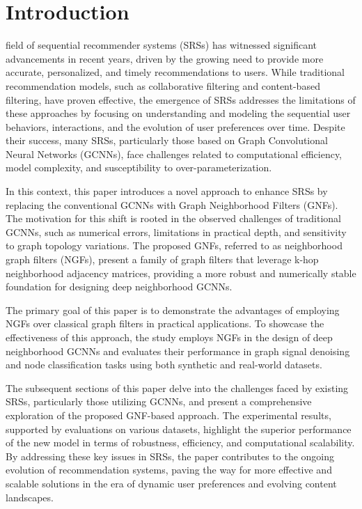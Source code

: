 \documentclass[journal]{IEEEtran}
\begin{document}
\section{Introduction}

 field of sequential recommender systems (SRSs) has witnessed significant advancements 
in recent years, driven by the growing need to provide more accurate, personalized, and timely recommendations 
to users. While traditional recommendation models, such as collaborative filtering and content-based filtering, 
have proven effective, the emergence of SRSs addresses the limitations of these approaches by focusing on 
understanding and modeling the sequential user behaviors, interactions, and the evolution of user preferences 
over time. Despite their success, many SRSs, particularly those based on Graph Convolutional Neural Networks 
(GCNNs), face challenges related to computational efficiency, model complexity, and susceptibility to 
over-parameterization.

In this context, this paper introduces a novel approach to enhance SRSs by replacing the conventional GCNNs 
with Graph Neighborhood Filters (GNFs). The motivation for this shift is rooted in the observed challenges 
of traditional GCNNs, such as numerical errors, limitations in practical depth, and sensitivity to graph 
topology variations. The proposed GNFs, referred to as neighborhood graph filters (NGFs), present a family 
of graph filters that leverage k-hop neighborhood adjacency matrices, providing a more robust and numerically 
stable foundation for designing deep neighborhood GCNNs.

The primary goal of this paper is to demonstrate the advantages of employing NGFs over classical graph filters 
in practical applications. To showcase the effectiveness of this approach, the study employs NGFs in the design 
of deep neighborhood GCNNs and evaluates their performance in graph signal denoising and node classification 
tasks using both synthetic and real-world datasets.

The subsequent sections of this paper delve into the challenges faced by existing SRSs, particularly those 
utilizing GCNNs, and present a comprehensive exploration of the proposed GNF-based approach. The experimental 
results, supported by evaluations on various datasets, highlight the superior performance of the new model in 
terms of robustness, efficiency, and computational scalability. By addressing these key issues in SRSs, the 
paper contributes to the ongoing evolution of recommendation systems, paving the way for more effective and 
scalable solutions in the era of dynamic user preferences and evolving content landscapes.
\end{document}

